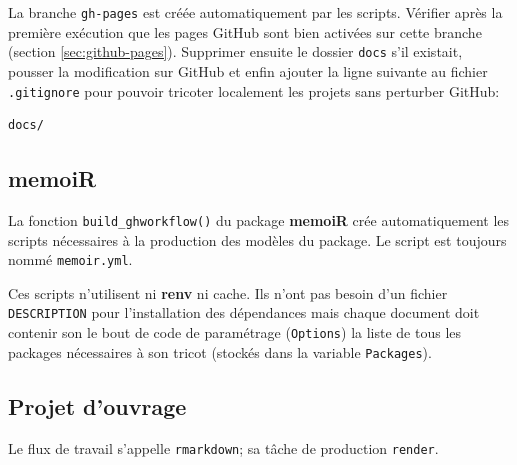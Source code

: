\documentclass[
  12pt,
  french,
  a4paper,
  extrafontsizes,onecolumn,openright
  ]{memoir}
\begin{document}
La branche \texttt{gh-pages} est créée automatiquement par les scripts.
Vérifier après la première exécution que les pages GitHub sont bien activées sur cette branche (section \ref{sec:github-pages}).
Supprimer ensuite le dossier \texttt{docs} s'il existait, pousser la modification sur GitHub et enfin ajouter la ligne suivante au fichier \texttt{.gitignore} pour pouvoir tricoter localement les projets sans perturber GitHub:

\begin{verbatim}
docs/
\end{verbatim}

\hypertarget{sec:memoiR-ci}{%
\subsection{memoiR}\label{sec:memoiR-ci}}

La fonction \texttt{build\_ghworkflow()} du package \textbf{memoiR} crée automatiquement les scripts nécessaires à la production des modèles du package.
Le script est toujours nommé \texttt{memoir.yml}.

Ces scripts n'utilisent ni \textbf{renv} ni cache.
Ils n'ont pas besoin d'un fichier \texttt{DESCRIPTION} pour l'installation des dépendances mais chaque document doit contenir son le bout de code de paramétrage (\texttt{Options}) la liste de tous les packages nécessaires à son tricot (stockés dans la variable \texttt{Packages}).

\hypertarget{sec:bookdown-ci}{%
\subsection{Projet d'ouvrage}\label{sec:bookdown-ci}}

Le flux de travail s'appelle \texttt{rmarkdown}; sa tâche de production \texttt{render}.
\end{document}
